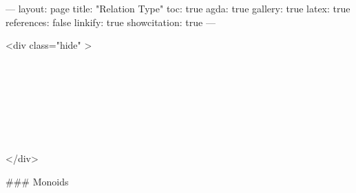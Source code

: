 ---
layout: page
title: "Relation Type"
toc: true
agda: true
gallery: true
latex: true
references: false
linkify: true
showcitation: true
---

<div class="hide" >
\begin{code}%
\>[0]\AgdaSymbol{\{-\#}\AgdaSpace{}%
\AgdaSpace{}%
\AgdaSpace{}%
\AgdaSymbol{\#-\}}\<%
\\
\>[0]\AgdaSpace{}%
\AgdaSpace{}%
\<%
\\
\>[0]\AgdaSpace{}%
\AgdaSpace{}%
\<%
\\
%
\\[\AgdaEmptyExtraSkip]%
\>[0]\AgdaSpace{}%
\AgdaSpace{}%
\<%
\\
\>[0]\AgdaSpace{}%
\AgdaSpace{}%
\<%
\\
\>[0]\AgdaSpace{}%
\AgdaSpace{}%
\<%
\end{code}
</div>

### Monoids

\begin{code}%
\>[0]\<%
\\
\>[0][@{}l@{\AgdaIndent{0}}]%
\>[2]\<%
\\
\>[2][@{}l@{\AgdaIndent{0}}]%
\>[4]\<%
\end{code}

